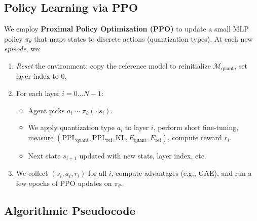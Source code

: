 \documentclass{article}
\begin{document}
	\subsection{Policy Learning via PPO}
	We employ \textbf{Proximal Policy Optimization (PPO)} \cite{ppo2017} to update a small MLP policy $\pi_\theta$ that maps states to discrete actions (quantization types). At each new \emph{episode}, we:
	\begin{enumerate}
		\item \emph{Reset} the environment: copy the reference model to reinitialize $\mathcal{M}_\text{quant}$, set layer index to 0.
		\item For each layer $i=0 \dots N-1$:
		\begin{itemize}
			\item Agent picks $a_i \sim \pi_\theta(\cdot|s_i)$.
			\item We apply quantization type $a_i$ to layer $i$, perform short fine-tuning, measure $(\mathrm{PPL}_\text{quant}, \mathrm{PPL}_\text{ref}, \mathrm{KL}, E_\text{quant}, E_\text{ref})$, compute reward $r_i$.
			\item Next state $s_{i+1}$ updated with new stats, layer index, etc.
		\end{itemize}
		\item We collect $(s_i,a_i,r_i)$ for all $i$, compute advantages (e.g., GAE), and run a few epochs of PPO updates on $\pi_\theta$.
	\end{enumerate}
	
	\vspace{-0.75em}
	\subsection{Algorithmic Pseudocode}
	\label{subsec:pseudocode}
	\vspace{-0.25em}
	
\end{document}
